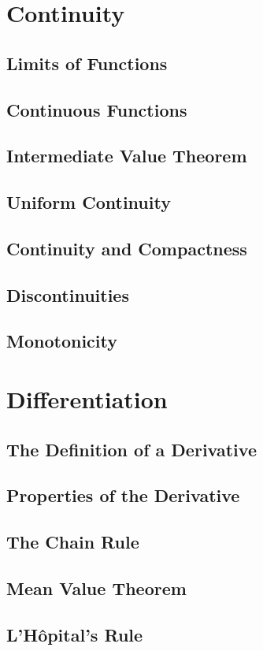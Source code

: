 \documentclass{article}
\theoremstyle{definition}
\begin{document}
\section{Continuity}
\subsection{Limits of Functions}
\subsection{Continuous Functions}
\subsection{Intermediate Value Theorem}
\subsection{Uniform Continuity}
\subsection{Continuity and Compactness}
\subsection{Discontinuities}
\subsection{Monotonicity}
\section{Differentiation}
\subsection{The Definition of a Derivative}
\subsection{Properties of the Derivative}
\subsection{The Chain Rule}
\subsection{Mean Value Theorem}
\subsection{L'H\^{o}pital's Rule}
\end{document}
